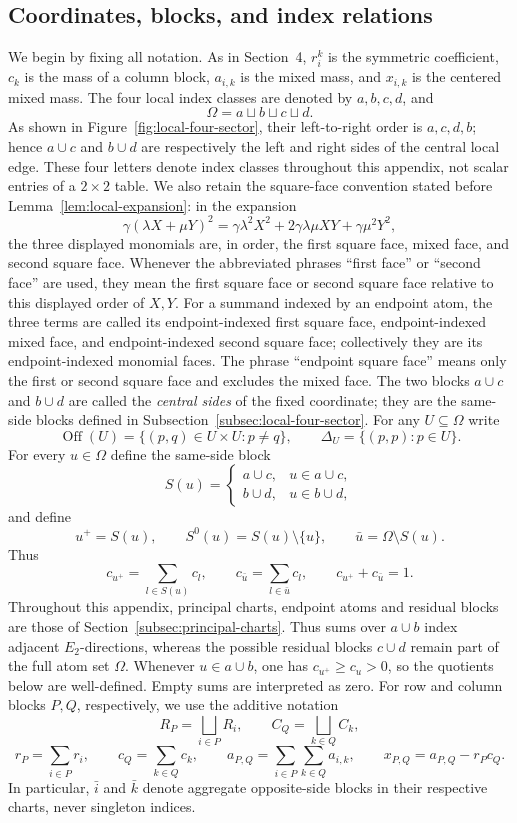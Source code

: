 \documentclass[11pt]{article}
\newcommand{\Off}{\operatorname{Off}}
\begin{document}
\subsection{Coordinates, blocks, and index relations}

We begin by fixing all notation.  As in Section~4, $r_i^k$ is the symmetric
coefficient, $c_k$ is the mass of a column block, $a_{i,k}$ is the mixed mass,
and $x_{i,k}$ is the centered mixed mass.  The four local index classes are
denoted by $a,b,c,d$, and
\[
\Omega=a\sqcup b\sqcup c\sqcup d.
\]
As shown in Figure~\ref{fig:local-four-sector}, their left-to-right order is
$a,c,d,b$; hence $a\cup c$ and $b\cup d$ are respectively the left and right
sides of the central local edge.
These four letters denote index classes throughout this appendix, not scalar
entries of a $2\times2$ table.  We also retain the square-face convention
stated before Lemma~\ref{lem:local-expansion}: in the expansion
\[
\gamma(\lambda X+\mu Y)^2
=\gamma\lambda^2X^2+2\gamma\lambda\mu XY+\gamma\mu^2Y^2,
\]
the three displayed monomials are, in order, the first square face, mixed
face, and second square face.  Whenever the abbreviated phrases ``first
face'' or ``second face'' are used, they mean the first square face or second
square face relative to this displayed order of $X,Y$.  For a summand indexed
by an endpoint atom, the three terms are called its endpoint-indexed first
square face, endpoint-indexed mixed face, and endpoint-indexed second square
face; collectively they are its endpoint-indexed monomial faces.  The phrase
``endpoint square face'' means only the first or second square face and
excludes the mixed face.
The two blocks $a\cup c$ and $b\cup d$ are called the \emph{central sides} of
the fixed coordinate; they are the same-side blocks defined in
Subsection~\ref{subsec:local-four-sector}.
For any $U\subseteq\Omega$ write
\[
\Off(U)=\{(p,q)\in U\times U:p\ne q\},\qquad
\Delta_U=\{(p,p):p\in U\}.
\]
For every $u\in\Omega$ define the same-side block
\[
S(u)=
\begin{cases}
a\cup c,&u\in a\cup c,\\
b\cup d,&u\in b\cup d,
\end{cases}
\]
and define
\[
u^+=S(u),\qquad S^0(u)=S(u)\setminus\{u\},\qquad \bar u=\Omega\setminus S(u).
\]
Thus
\[
c_{u^+}=\sum_{l\in S(u)}c_l,
\qquad
c_{\bar u}=\sum_{l\in\bar u}c_l,
\qquad
c_{u^+}+c_{\bar u}=1.
\]
Throughout this appendix, principal charts, endpoint atoms and residual blocks
are those of Section~\ref{subsec:principal-charts}.  Thus sums over
$a\cup b$ index adjacent $E_2$-directions, whereas the possible residual
blocks $c\cup d$ remain part of the full atom set $\Omega$.  Whenever
$u\in a\cup b$, one has $c_{u^+}\ge c_u>0$, so the quotients below are
well-defined.  Empty sums are interpreted as zero.  For row and column blocks
$P,Q$, respectively, we use the additive notation
\[
 R_P=\bigsqcup_{i\in P}R_i,\qquad
 C_Q=\bigsqcup_{k\in Q}C_k,
\]
\[
 r_P=\sum_{i\in P}r_i,\qquad
 c_Q=\sum_{k\in Q}c_k,\qquad
 a_{P,Q}=\sum_{i\in P}\sum_{k\in Q}a_{i,k},\qquad
 x_{P,Q}=a_{P,Q}-r_Pc_Q.
\]
In particular, $\bar i$ and $\bar k$ denote aggregate opposite-side blocks
in their respective charts, never singleton indices.
\end{document}
